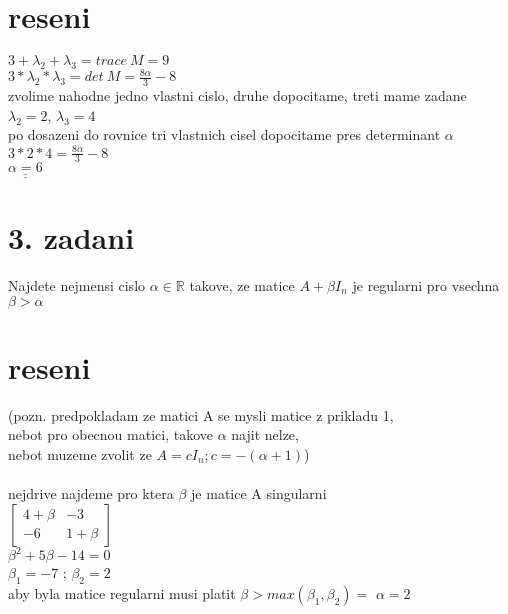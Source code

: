 \documentclass[a4paper]{article}
\def\doubleunderline#1{\underline{\underline{#1}}}
\begin{document}
\section*{reseni}
$3+\lambda_2+\lambda_3=trace~M=9$\\
$3*\lambda_2*\lambda_3=det~M=\frac{8\alpha}{3}-8$\\
zvolime nahodne jedno vlastni cislo, druhe dopocitame, treti mame zadane\\
$\lambda_2=2$, $\lambda_3=4$\\
po dosazeni do rovnice tri vlastnich cisel dopocitame pres determinant $\alpha$\\
$3*2*4=\frac{8\alpha}{3}-8$\\
$\doubleunderline{\alpha=6}$\\













\section*{3. zadani}
Najdete nejmensi cislo $\alpha \in \mathbb{R}$ takove, ze matice 
$A+\beta I_n$ je regularni pro vsechna $\beta > \alpha$\\

\section*{reseni}
(pozn. predpokladam ze matici A se mysli matice z prikladu 1,\\
nebot pro obecnou matici, takove $\alpha$ najit nelze,\\
nebot muzeme zvolit ze $A = cI_n; c=-(\alpha+1)$)
\\\\
nejdrive najdeme pro ktera $\beta$ je matice A singularni\\
$\left[\begin{matrix}
	4+\beta & -3\\
	-6 & 1+\beta
\end{matrix}\right]$\\
$\beta^2+5\beta-14=0$\\
$\beta_1 = -7$ ; $\beta_2 = 2$\\
aby byla matice regularni musi platit
$\beta > max(\beta_1, \beta_2) = $ \doubleunderline{$\alpha = 2$}\\
\end{document}
